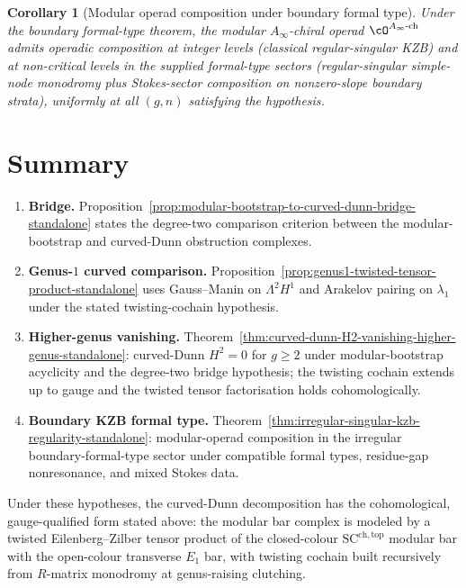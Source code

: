 \documentclass[11pt]{amsart}
\newtheorem{corollary}[theorem]{Corollary}
\theoremstyle{definition}
\theoremstyle{remark}
\providecommand{\Ainf}{A_\infty}
\begin{document}
\begin{corollary}[Modular operad composition under boundary formal type]%
\label{cor:modular-operad-composition-all-levels-standalone}%
Under the boundary formal-type theorem, the modular
$\Ainf$-chiral operad $\cO^{\Ainf\text{-ch}}$ admits
operadic composition at integer levels (classical regular-singular
KZB) and at non-critical levels in the supplied formal-type sectors
(regular-singular simple-node monodromy plus Stokes-sector
composition on nonzero-slope boundary strata), uniformly at all
$(g,n)$ satisfying the hypothesis.
\end{corollary}

\section{Summary}
\label{sec:cd-summary-standalone}

\begin{enumerate}[label=\textup{(\arabic*)}]
\item \textbf{Bridge.}
  Proposition~\ref{prop:modular-bootstrap-to-curved-dunn-bridge-standalone}
  states the degree-two comparison criterion between the
  modular-bootstrap and curved-Dunn obstruction complexes.
\item \textbf{Genus-$1$ curved comparison.}
  Proposition~\ref{prop:genus1-twisted-tensor-product-standalone} uses
  Gauss--Manin on $\Lambda^2 H^1$ and Arakelov pairing on
  $\lambda_1$ under the stated twisting-cochain hypothesis.
\item \textbf{Higher-genus vanishing.}
  Theorem~\ref{thm:curved-dunn-H2-vanishing-higher-genus-standalone}: curved-Dunn
  $H^2 = 0$ for $g \ge 2$ under modular-bootstrap acyclicity and the
  degree-two bridge hypothesis; the twisting cochain extends up to
  gauge and the twisted tensor factorisation holds cohomologically.
\item \textbf{Boundary KZB formal type.}
  Theorem~\ref{thm:irregular-singular-kzb-regularity-standalone}: modular-operad
  composition in the irregular boundary-formal-type sector under
  compatible formal types, residue-gap nonresonance, and mixed Stokes
  data.
\end{enumerate}

Under these hypotheses, the curved-Dunn decomposition has the
cohomological, gauge-qualified form stated above: the modular bar
complex is modeled by a twisted Eilenberg--Zilber tensor product of
the closed-colour $\mathrm{SC}^{\mathrm{ch,top}}$ modular bar with
the open-colour transverse $E_1$ bar, with twisting cochain built
recursively from $R$-matrix monodromy at genus-raising clutching.
\end{document}
